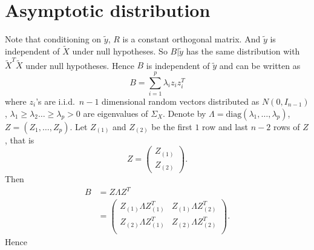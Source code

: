 \section{Asymptotic distribution}
Note that conditioning on $\tilde{y}$, $R$ is a constant orthogonal matrix.
And $\tilde{y}$ is independent of $\tilde{X}$ under null hypotheses.
So  $B|\tilde{y}$ has the same distribution with $\tilde{X}^T \tilde{X}$ under null hypotheses.
Hence $B$ is independent of $\tilde{y}$ and can be written as
    \begin{equation}\label{Xdis}
    B=\sum_{i=1}^p \lambda_i z_i z_i^T
    \end{equation}
where $z_i$'s are i.i.d.\ $n-1$ dimensional random vectors  distributed as $N(0,I_{n-1})$, $\lambda_1\geq \lambda_2\ldots \geq \lambda_p>0$ are eigenvalues of $\Sigma_X$. 
Denote by $\Lambda=\textrm{diag} (\lambda_1,\ldots,\lambda_p)$, $Z=(Z_1,\ldots,Z_p)$. Let $Z_{(1)}$ and $Z_{(2)}$ be the first $1$ row and last $n-2$ rows of $Z$, that is
\[
    Z=\begin{pmatrix} 
        Z_{(1)}\\
        Z_{(2)}
    \end{pmatrix}.
    \]
Then
\begin{equation}
    \begin{aligned}
        B&=Z\Lambda Z^T\\
        &=\begin{pmatrix}
            Z_{(1)}\Lambda Z_{(1)}^T & Z_{(1)}\Lambda Z_{(2)}^T\\
            Z_{(2)}\Lambda Z_{(1)}^T & Z_{(2)}\Lambda Z_{(2)}^T\\
        \end{pmatrix}.
    \end{aligned}
\end{equation}
Hence

